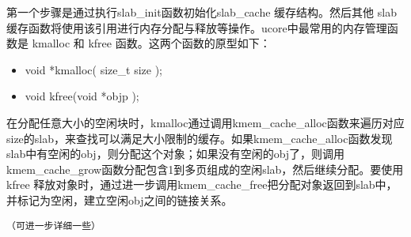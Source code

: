 第一个步骤是通过执行slab\_init函数初始化slab\_cache 缓存结构。然后其他
slab
缓存函数将使用该引用进行内存分配与释放等操作。ucore中最常用的内存管理函数是
kmalloc 和 kfree 函数。这两个函数的原型如下：

\begin{itemize}
\item
  void *kmalloc( size\_t size );
\item
  void kfree(void *objp );
\end{itemize}

在分配任意大小的空闲块时，kmalloc通过调用kmem\_cache\_alloc函数来遍历对应size的slab，来查找可以满足大小限制的缓存。如果kmem\_cache\_alloc函数发现slab中有空闲的obj，则分配这个对象；如果没有空闲的obj了，则调用kmem\_cache\_grow函数分配包含1到多页组成的空闲slab，然后继续分配。要使用
kfree
释放对象时，通过进一步调用kmem\_cache\_free把分配对象返回到slab中，并标记为空闲，建立空闲obj之间的链接关系。

\lstinline!（可进一步详细一些）!
